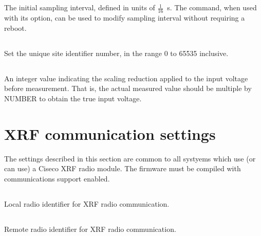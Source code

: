 \subsection[sampling-interval-16th-s]{}
\label{sec:eeprom-sampling-interval}

The initial sampling interval, defined in units of
$\frac{1}{16}$\SI{}{s}. The  command, when used with
its  option, can be used to modify sampling
interval without requiring a reboot.

\subsection[site-id]{}
Set the unique site identifier number, in the range 0 to 65535 inclusive.

\subsection[vin-divider]{}

An integer value indicating the scaling reduction applied to the input voltage
before measurement. That is, the actual measured value should be multiple by
NUMBER to obtain the true input voltage.


\section{XRF communication settings}

The settings described in this section are common to all systyems
which use (or can use) a Ciseco XRF radio module. The firmware must be
compiled with  communications support enabled.

\subsection[radio-local-id]{}

Local radio identifier for XRF radio communication.

\subsection[radio-remote-id]{}

Remote radio identifier for XRF radio communication. 

\subsection[radio-xrf-band]{}

